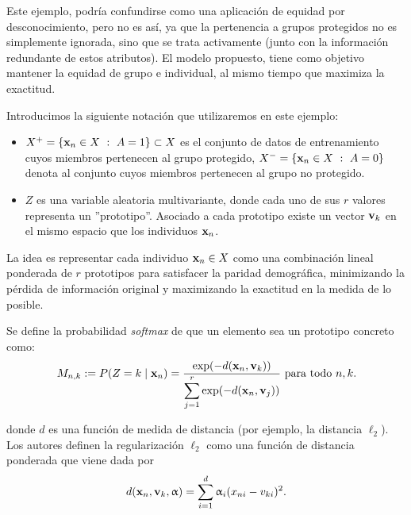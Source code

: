 \documentclass[oneside,openright,titlepage,numbers=noenddot,openany,headinclude,footinclude=true,
cleardoublepage=empty,abstractoff,BCOR=5mm,paper=a4,fontsize=12pt,main=spanish]{scrreprt}
\begin{document}
Este ejemplo, podría confundirse como una aplicación de equidad por desconocimiento, pero no es así, ya que la pertenencia a grupos protegidos no es simplemente ignorada, sino que se trata activamente (junto con la información redundante de estos atributos). El modelo propuesto, tiene como objetivo mantener la equidad de grupo e individual, al mismo tiempo que maximiza la exactitud.

\begin{notation}
Introducimos la siguiente notación que utilizaremos en este ejemplo:

\begin{itemize}
    \item $X^+=\{\nm{x}_n \in X \ : \ A=1\}\subset X$ es el conjunto de datos de entrenamiento cuyos miembros pertenecen al grupo protegido, $X^-=\{\textbf{x}_n \in X \ : \ A=0\}$ denota al conjunto cuyos miembros pertenecen al grupo no protegido.
    \item $Z$ es una variable aleatoria multivariante, donde cada uno de sus $r$ valores representa un ''prototipo''. Asociado a cada prototipo existe un vector $\textbf{v}_k$ en el mismo espacio que los individuos $\textbf{x}_n$.
\end{itemize}
\end{notation}

La idea es representar cada individuo $\textbf{x}_n \in X$ como una combinación lineal ponderada de $r$ prototipos para satisfacer la paridad demográfica, minimizando la pérdida de información original y maximizando la exactitud en la medida de lo posible.

Se define la probabilidad \textit{softmax} de que un elemento sea un prototipo concreto como:
\begin{equation*}
M_{n,k}:= P(Z=k \mid \nm{x}_n)=\ddfrac{\text{exp}(-d(\nm{x}_n,\nm{v}_k))}{\sum_{j=1}^r \text{exp}(-d(\nm{x}_n,\nm{v}_j))} \ \text{para todo} \ n,k.
\end{equation*}

donde $d$ es una función de medida de distancia (por ejemplo, la distancia $\ell_2$). Los autores definen la regularización $\ell_2$ como una función de distancia ponderada que viene dada por
\begin{equation*}
d(\textbf{x}_n,\textbf{v}_k,\upalpha)=\sum_{i=1}^d \upalpha_i (x_{ni}-v_{ki})^2.
\end{equation*}
\end{document}
